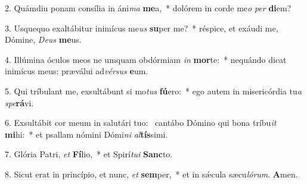 2. Quámdiu ponam consília in áni\textit{ma} \textbf{me}a,~*  dolórem in corde me\textit{o} \textit{per} \textbf{di}em?\

3. Usquequo exaltábitur inimícus me\textit{us} \textbf{su}per me?~*  réspice, et exáudi me, Dómine, \textit{De}\textit{us} \textbf{me}us.\

4. Illúmina óculos meos ne umquam obdórmiam \textit{in} \textbf{mor}te:~*  nequándo dicat inimícus meus: præválui ad\textit{vér}\textit{sus} \textbf{e}um.\

5. Qui tríbulant me, exsultábunt si mo\textit{tus} \textbf{fú}ero:~*  ego autem in misericórdia tu\textit{a} \textit{spe}\textbf{rá}vi.\

6. Exsultábit cor meum in salutári tuo: \dag\  cantábo Dómino qui bona tríbu\textit{it} \textbf{mi}hi:~*  et psallam nómini Dómi\textit{ni} \textit{al}\textbf{tís}simi.\

7. Glória Patri, \textit{et} \textbf{Fí}lio,~*  et Spirí\textit{tu}\textit{i} \textbf{Sanc}to.\

8. Sicut erat in princípio, et nunc, \textit{et} \textbf{sem}per,~*  et in sǽcula sæcu\textit{ló}\textit{rum}. \textbf{A}men.\

